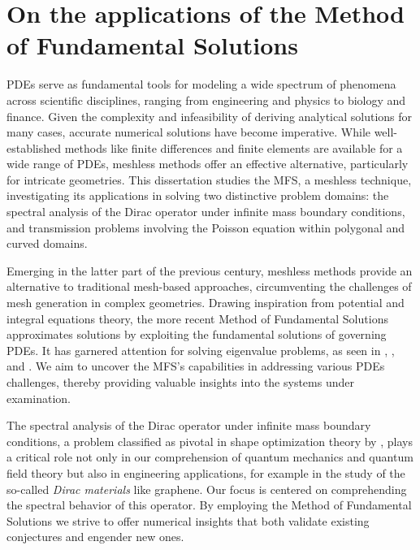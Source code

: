 \label{chap:intro}

\section{On the applications of the Method of Fundamental Solutions}

\acp{PDE} serve as fundamental tools for modeling a wide spectrum of phenomena across scientific disciplines, ranging from engineering and physics to biology and finance. Given the complexity and infeasibility of deriving analytical solutions for many cases, accurate numerical solutions have become imperative. While well-established methods like finite differences and finite elements are available for a wide range of \acp{PDE}, meshless methods offer an effective alternative, particularly for intricate geometries. This dissertation studies the \ac{MFS}, a meshless technique, investigating its applications in solving two distinctive problem domains: the spectral analysis of the Dirac operator under infinite mass boundary conditions, and transmission problems involving the Poisson equation within polygonal and curved domains.

Emerging in the latter part of the previous century, meshless methods provide an alternative to traditional mesh-based approaches, circumventing the challenges of mesh generation in complex geometries. Drawing inspiration from potential and integral equations theory, the more recent Method of Fundamental Solutions approximates solutions by exploiting the fundamental solutions of governing \acp{PDE}. It has garnered attention for solving eigenvalue problems, as seen in \cite{alves2013method}, \cite{reutskiy2006method}, and \cite{antunes2011inverse}. We aim to uncover the \ac{MFS}'s capabilities in addressing various \acp{PDE} challenges, thereby providing valuable insights into the systems under examination.

The spectral analysis of the Dirac operator under infinite mass boundary conditions, a problem classified as pivotal in shape optimization theory by \cite{krejcirik_larson_lotoreichik_2019}, plays a critical role not only in our comprehension of quantum mechanics and quantum field theory but also in engineering applications, for example in the study of the so-called \textit{Dirac materials} like graphene. Our focus is centered on comprehending the spectral behavior of this operator. By employing the Method of Fundamental Solutions we strive to offer numerical insights that both validate existing conjectures and engender new ones.

